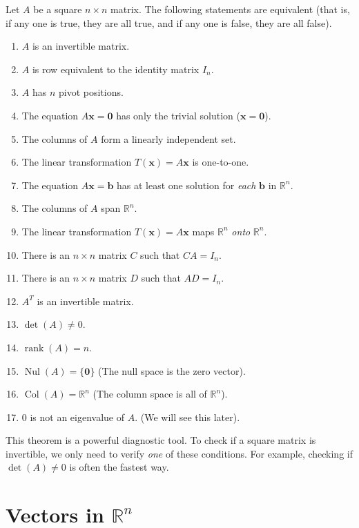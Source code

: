 \documentclass[oneside]{book}
\begin{document}
\begin{theorem}
Let $A$ be a square $n \times n$ matrix. The following statements are equivalent (that is, if any one is true, they are all true, and if any one is false, they are all false).
\begin{enumerate}
    \item $A$ is an invertible matrix.
    \item $A$ is row equivalent to the identity matrix $I_n$.
    \item $A$ has $n$ pivot positions.
    \item The equation $A\mathbf{x} = \mathbf{0}$ has only the trivial solution ($\mathbf{x} = \mathbf{0}$).
    \item The columns of $A$ form a linearly independent set.
    \item The linear transformation $T(\mathbf{x}) = A\mathbf{x}$ is one-to-one.
    \item The equation $A\mathbf{x} = \mathbf{b}$ has at least one solution for \emph{each} $\mathbf{b}$ in $\mathbb{R}^n$.
    \item The columns of $A$ span $\mathbb{R}^n$.
    \item The linear transformation $T(\mathbf{x}) = A\mathbf{x}$ maps $\mathbb{R}^n$ \emph{onto} $\mathbb{R}^n$.
    \item There is an $n \times n$ matrix $C$ such that $CA = I_n$.
    \item There is an $n \times n$ matrix $D$ such that $AD = I_n$.
    \item $A^T$ is an invertible matrix.
    \item $\det(A) \neq 0$.
    \item $\operatorname{rank}(A) = n$.
    \item $\operatorname{Nul}(A) = \{\mathbf{0}\}$ (The null space is the zero vector).
    \item $\operatorname{Col}(A) = \mathbb{R}^n$ (The column space is all of $\mathbb{R}^n$).
    \item 0 is not an eigenvalue of $A$. (We will see this later).
\end{enumerate}
\end{theorem}

This theorem is a powerful diagnostic tool. To check if a square matrix is invertible, we only need to verify \emph{one} of these conditions. For example, checking if $\det(A) \neq 0$ is often the fastest way.

\section{Vectors in $\mathbb{R}^n$}
\end{document}
